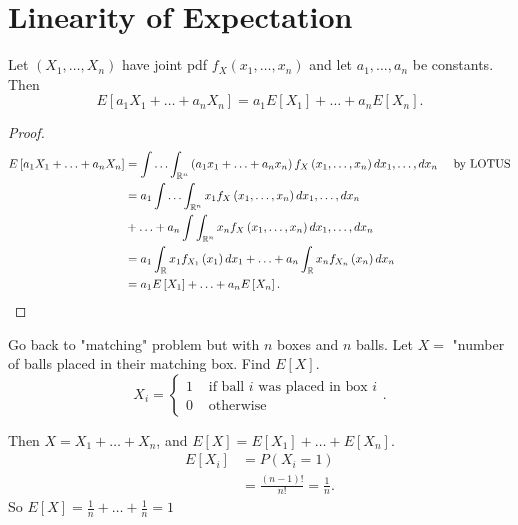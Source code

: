 \section{Linearity of Expectation}

Let $\left( X_{1} , \ldots , X_{n} \right) $ have joint pdf $f_{X}\left( x_{1} , \ldots , x_{n} \right) $ and let $a_{1} , \ldots , a_{n}$ be constants. Then
\[
E\left[ a_1X_1 + \ldots + a_{n}X_{n} \right] = a_1 E\left[ X_1 \right]  + \ldots + a_n E\left[ X_{n} \right] 
.\]
\begin{proof}
	\begin{align*}
		E\left[ a_1X_1 + \ldots + a_{n}X_{n} \right] &= \int \ldots \int_{\mathbb{R}^{n}}^{ } \left(  a_1x_1 + \ldots + a_{n}x_{n}\right) f_{X}\left( x_{1} , \ldots , x_{n} \right) dx_{1} , \ldots , dx_{n}  \quad \text{ by LOTUS}\\
							     &= a_1 \int \ldots \int_{\mathbb{R}^{n}}^{ } x_1 f_{X}\left( x_{1} , \ldots , x_{n} \right) dx_{1} , \ldots , dx_{n}  \\
							     & +\ldots+ a_{n} \int \int_{\mathbb{R}^{n}}^{ } x_{n}f_{X}\left( x_{1} , \ldots , x_{n} \right) dx_{1} , \ldots , dx_{n}  \\
							     &= a_1 \int_{\mathbb{R}}^{ } x_1 f_{X_1}\left( x_1 \right) dx_1  + \ldots + a_{n}\int_{\mathbb{R}}^{ } x_{n}f_{X_{n}}\left( x_{n} \right) dx_{n}\\
							     &= a_1 E\left[ X_1 \right]  + \ldots + a_n E\left[ X_{n} \right] 
	.\end{align*}
\end{proof}

\begin{eg}
	Go back to "matching" problem but with $n$ boxes and $n$ balls. Let $X = $ "number of balls placed in their matching box. Find $E\left[ X \right] $. 
\[
	X_{i} = \begin{cases}
		1 & \text{ if ball } i \text{ was placed in box } i \\
		0 & \text{ otherwise}
	\end{cases}
	.\]

	Then $X = X_1 + \ldots + X_{n}$, and $E\left[ X \right] = E\left[ X_1 \right]  + \ldots + E\left[ X_{n} \right] $. 
\begin{align*}
	E\left[ X_{i} \right]  &= P\left( X_{i} = 1 \right)  \\
			       &= \frac{\left( n - 1 \right) !}{n!} = \frac{1}{n} 
.\end{align*}	
	So $E\left[ X \right]  = \frac{1}{n} + \ldots + \frac{1}{n} = 1$
\end{eg}


